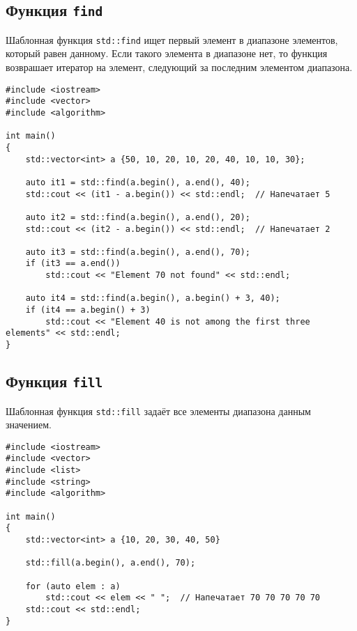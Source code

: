 \documentclass{article}
\begin{document}
\subsection*{Функция \texttt{find}}
Шаблонная функция \texttt{std::find} ищет первый элемент в диапазоне элементов, который равен данному. Если такого элемента в диапазоне нет, то функция возврашает итератор на элемент, следующий за последним элементом диапазона.
\begin{lstlisting}
#include <iostream>
#include <vector>
#include <algorithm>

int main()
{
	std::vector<int> a {50, 10, 20, 10, 20, 40, 10, 10, 30};
	
	auto it1 = std::find(a.begin(), a.end(), 40);
	std::cout << (it1 - a.begin()) << std::endl;  // Напечатает 5
		
    auto it2 = std::find(a.begin(), a.end(), 20);
	std::cout << (it2 - a.begin()) << std::endl;  // Напечатает 2
	
	auto it3 = std::find(a.begin(), a.end(), 70);
	if (it3 == a.end())
		std::cout << "Element 70 not found" << std::endl;

	auto it4 = std::find(a.begin(), a.begin() + 3, 40);
	if (it4 == a.begin() + 3)
		std::cout << "Element 40 is not among the first three elements" << std::endl;
}
\end{lstlisting}


\subsection*{Функция \texttt{fill}}
Шаблонная функция \texttt{std::fill} задаёт все элементы диапазона данным значением.
\begin{lstlisting}
#include <iostream>
#include <vector>
#include <list>
#include <string>
#include <algorithm>

int main()
{
	std::vector<int> a {10, 20, 30, 40, 50}
	
	std::fill(a.begin(), a.end(), 70);
	
	for (auto elem : a)                        
		std::cout << elem << " ";  // Напечатает 70 70 70 70 70
	std::cout << std::endl;
}
\end{lstlisting}

\newpage
\end{document}
